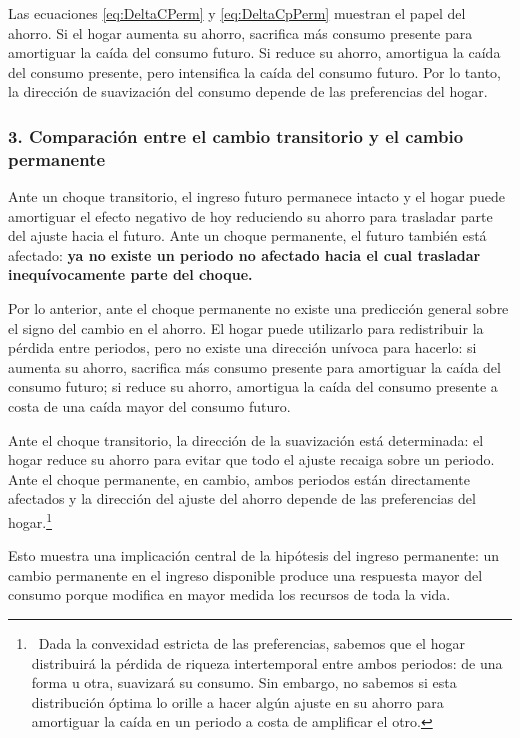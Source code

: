 \documentclass[11pt]{article}
\begin{document}
Las ecuaciones \eqref{eq:DeltaCPerm} y \eqref{eq:DeltaCpPerm} muestran el papel del ahorro. Si el hogar aumenta su ahorro, sacrifica más consumo presente para amortiguar la caída del consumo futuro. Si reduce su ahorro, amortigua la caída del consumo presente, pero intensifica la caída del consumo futuro. Por lo tanto, la dirección de suavización del consumo depende de las preferencias del hogar.


\subsubsection*{3. Comparación entre el cambio transitorio y el cambio permanente}

Ante un choque transitorio, el ingreso futuro permanece intacto y el hogar puede amortiguar el efecto negativo de hoy reduciendo su ahorro para trasladar parte del ajuste hacia el futuro. Ante un choque permanente, el futuro también está afectado: \textbf{ya no existe un periodo no afectado hacia el cual trasladar inequívocamente parte del choque.}

Por lo anterior, ante el choque permanente no existe una predicción general sobre el signo del cambio en el ahorro. El hogar puede utilizarlo para redistribuir la pérdida entre periodos, pero no existe una dirección unívoca para hacerlo: si aumenta su ahorro, sacrifica más consumo presente para amortiguar la caída del consumo futuro; si reduce su ahorro, amortigua la caída del consumo presente a costa de una caída mayor del consumo futuro.


Ante el choque transitorio, la dirección de la suavización está determinada: el hogar reduce su ahorro para evitar que todo el ajuste recaiga sobre un periodo. Ante el choque permanente, en cambio, ambos periodos están directamente afectados y la dirección del ajuste del ahorro depende de las preferencias del hogar.\footnote{\ Dada la convexidad estricta de las preferencias, sabemos que el hogar distribuirá la pérdida de riqueza intertemporal entre ambos periodos: de una forma u otra, suavizará su consumo. Sin embargo, no sabemos si esta distribución óptima lo orille a hacer algún ajuste en su ahorro para amortiguar la caída en un periodo a costa de amplificar el otro.}

Esto muestra una implicación central de la hipótesis del ingreso permanente: un cambio permanente en el ingreso disponible produce una respuesta mayor del consumo porque modifica en mayor medida los recursos de toda la vida.
\end{document}
